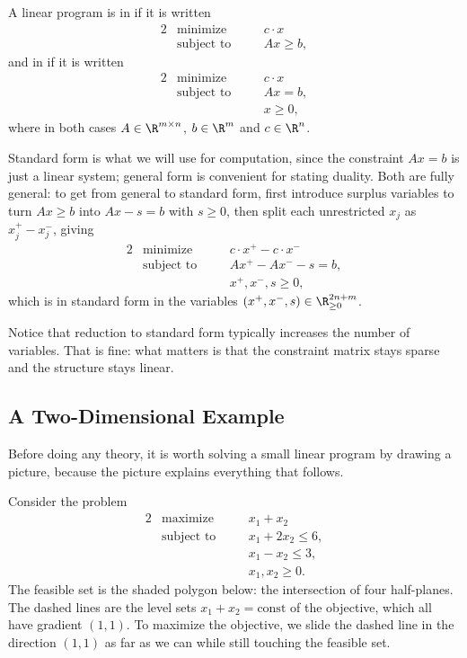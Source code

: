 \begin{definition}
    A linear program is in  if it is written
    \begin{alignat*}{2}
        & \text{minimize} \quad && c \cdot x \\
        & \text{subject to} \quad && Ax \geq b,
    \end{alignat*}
    and in  if it is written
    \begin{alignat*}{2}
        & \text{minimize} \quad && c \cdot x \\
        & \text{subject to} \quad && Ax = b, \\
        & && x \geq 0,
    \end{alignat*}
    where in both cases $A \in \R^{m\times n}$, $b \in \R^m$ and $c \in \R^n$.
\end{definition}

Standard form is what we will use for computation, since the constraint $Ax = b$ is just a linear system; general form is convenient for stating duality. Both are fully general: to get from general to standard form, first introduce surplus variables to turn $Ax \geq b$ into $Ax - s = b$ with $s \geq 0$, then split each unrestricted $x_j$ as $x_j^+ - x_j^-$, giving
\begin{alignat*}{2}
    & \text{minimize} \quad && c\cdot x^+ - c\cdot x^- \\
    & \text{subject to} \quad && Ax^+ - Ax^- - s = b, \\
    & && x^+, x^-, s \geq 0,
\end{alignat*}
which is in standard form in the variables $(x^+, x^-, s) \in \R^{2n + m}_{\geq 0}$.

Notice that reduction to standard form typically increases the number of variables. That is fine: what matters is that the constraint matrix stays sparse and the structure stays linear.

\subsection{A Two-Dimensional Example}

Before doing any theory, it is worth solving a small linear program by drawing a picture, because the picture explains everything that follows.

\begin{example}
    Consider the problem
    \begin{alignat*}{2}
        & \text{maximize} \quad && x_1 + x_2 \\
        & \text{subject to} \quad && x_1 + 2x_2 \leq 6, \\
        & && x_1 - x_2 \leq 3,\\
        & && x_1, x_2 \geq 0.
    \end{alignat*}
    The feasible set is the shaded polygon below: the intersection of four half-planes. The dashed lines are the level sets $x_1 + x_2 = \text{const}$ of the objective, which all have gradient $(1,1)$. To maximize the objective, we slide the dashed line in the direction $(1,1)$ as far as we can while still touching the feasible set.
\end{example}

